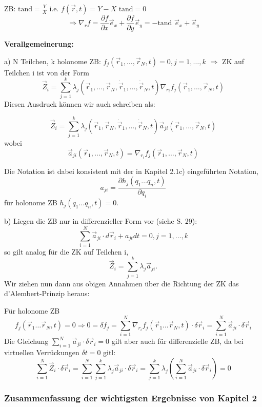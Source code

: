 \documentclass[10pt, letterpaper]{article}
\begin{document}
ZB: $\text{tand} = \frac{Y}{X}$ i.e. $f(\vec{r},t) = Y - X\text{ tand} = 0$
$$\Rightarrow \nabla_rf = \frac{\partial f}{\partial x}\vec{e}_x + \frac{\partial f}{\partial y}\vec{e}_y = -\text{tand }\vec{e}_x+\vec{e}_y$$


\textbf{Verallgemeinerung:}

a) N Teilchen, k holonome ZB: $f_j(\vec{r}_1,\dots,\vec{r}_N,t)=0, j=1,\dots,k$ $\Rightarrow$ ZK auf Teilchen i ist von der Form
$$\vec{Z}_i = \sum_{j=1}^k \lambda_j(\vec{r}_1,\dots,\vec{r}_N,\dot{\vec{r}}_1,\dots,\dot{\vec{r}}_N,t)\nabla_{r_i}f_j(\vec{r}_1,\dots,\vec{r}_N,t)$$
Diesen Ausdruck können wir auch schreiben als:

$$\vec{Z}_i = \sum_{j=1}^k \lambda_j(\vec{r}_1,\vec{r}_N,\dot{\vec{r}}_1,\dots,\dot{\vec{r}}_N,t)\vec{a}_{ji}(\vec{r}_1,\dots,\vec{r}_N,t)$$
wobei 
$$\vec{a}_{ji}(\vec{r}_1,\dots,\vec{r}_N,t) = \nabla_{r_i}f_j(\vec{r}_1,\dots,\vec{r}_N,t)$$

Die Notation ist dabei konsistent mit der in Kapitel 2.1c) eingeführten Notation,
$$a_{ji} = \frac{\partial h_j(q_1\dots q_n,t)}{\partial q_i}$$
für holonome ZB $h_j(q_1\dots q_n,t)=0$.



b) Liegen die ZB nur in differenzieller Form vor (siehe S. 29):
\[\sum_{i=1}^N \vec{a}_{ji}\cdot d\vec{r}_i + a_{jt}dt = 0, j=1,\dots,k\]
so gilt analog für die ZK auf Teilchen i,
\[\vec{Z}_i = \sum_{j=1}^k \lambda_j\vec{a}_{ji}.\]
Wir ziehen nun dann aus obigen Annahmen über die Richtung der ZK das d'Alembert-Prinzip heraus:

Für holonome ZB 
$$f_j(\vec{r}_1\dots\vec{r}_N,t)=0 \Rightarrow 0 = \delta f_j = \sum_{i=1}^N \nabla_{r_i}f_j(\vec{r}_1\dots\vec{r}_N,t)\cdot\delta\vec{r}_i = \sum_{i=1}^N \vec{a}_{ji}\cdot\delta\vec{r}_i$$
Die Gleichung $\sum_{i=1}^N \vec{a}_{ji}\cdot\delta\vec{r}_i=0$ gilt aber auch für differenzielle ZB, da bei virtuellen Verrückungen $\delta t = 0$ gitl:
$$\sum_{i=1}^N \vec{Z}_i\cdot\delta\vec{r}_i = \sum_{i=1}^N \sum_{j=1}^k \lambda_j\vec{a}_{ji}\cdot\delta\vec{r}_i = \sum_{j=1}^k \lambda_j(\sum_{i=1}^N \vec{a}_{ji}\cdot\delta\vec{r}_i) = 0$$




\subsubsection{Zusammenfassung der wichtigsten Ergebnisse von Kapitel 2}
\end{document}
